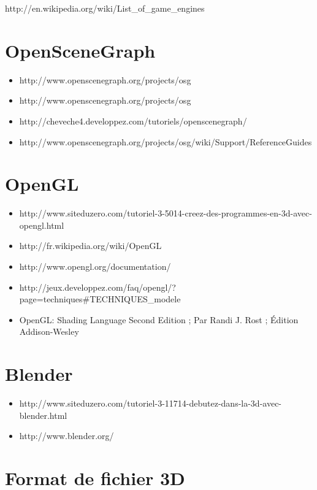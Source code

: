 \documentclass[a4paper,12pt]{report}
\begin{document}
    http://en.wikipedia.org/wiki/List\_of\_game\_engines

\section*{OpenSceneGraph}
\begin{itemize}
 \item http://www.openscenegraph.org/projects/osg
 
 \item http://www.openscenegraph.org/projects/osg
 
 \item http://cheveche4.developpez.com/tutoriels/openscenegraph/
 
 \item http://www.openscenegraph.org/projects/osg/wiki/Support/ReferenceGuides
\end{itemize}


\section*{OpenGL}
\begin{itemize}
 \item http://www.siteduzero.com/tutoriel-3-5014-creez-des-programmes-en-3d-avec-opengl.html

 \item http://fr.wikipedia.org/wiki/OpenGL

 \item http://www.opengl.org/documentation/

 \item http://jeux.developpez.com/faq/opengl/?page=techniques\#TECHNIQUES\_modele

 \item OpenGL: Shading Language Second Edition ; Par Randi J. Rost ; Édition Addison-Wesley 
\end{itemize}


\section*{Blender}
\begin{itemize}
 \item http://www.siteduzero.com/tutoriel-3-11714-debutez-dans-la-3d-avec-blender.html
 
 \item http://www.blender.org/
\end{itemize}
  

\section*{Format de fichier 3D}
\end{document}
